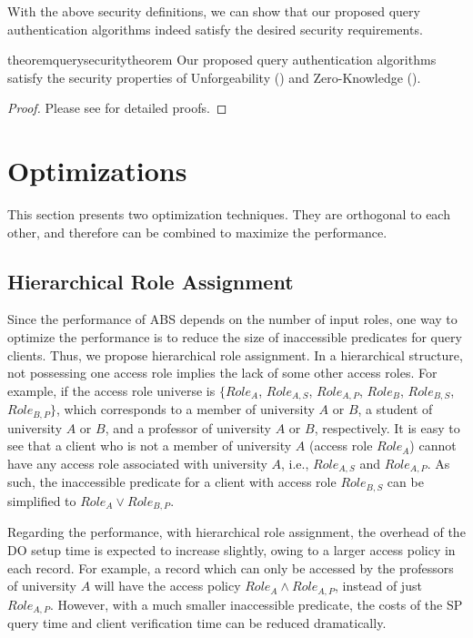 With the above security definitions, we can show that our proposed query authentication algorithms indeed satisfy the desired security requirements.

\begin{restatable}{theorem}{querysecuritytheorem}\label{thm:access-control:sec}
  Our proposed query authentication algorithms satisfy the security properties of Unforgeability () and Zero-Knowledge ().
\end{restatable}

\begin{proof}
  Please see  for detailed proofs.
\end{proof}

\section{Optimizations}\label{sec:access-control:opt}

This section presents two optimization techniques. They are orthogonal to each other, and therefore can be combined to maximize the performance.

\subsection{Hierarchical Role Assignment}
Since the performance of ABS depends on the number of input roles, one way to optimize the performance is to reduce the size of inaccessible predicates for query clients. Thus, we propose hierarchical role assignment. In a hierarchical structure, not possessing one access role implies the lack of some other access roles. For example, if the access role universe is $\{{Role}_A$, ${Role}_{A,S}$, ${Role}_{A,P}$, ${Role}_B$, ${Role}_{B,S}$, ${Role}_{B,P}\}$, which corresponds to a member of university $A$ or $B$, a student of university $A$ or $B$, and a professor of university $A$ or $B$, respectively. It is easy to see that a client who is not a member of university $A$ (access role ${Role}_A$) cannot have any access role associated with university $A$, i.e., ${Role}_{A,S}$ and ${Role}_{A,P}$. As such, the inaccessible predicate for a client with access role ${Role}_{B,S}$ can be simplified to ${Role}_A \lor {Role}_{B,P}$.

Regarding the performance, with hierarchical role assignment, the overhead of the DO setup time is expected to increase slightly, owing to a larger access policy in each record. For example, a  record which can only be accessed by the professors of university $A$ will have the access policy ${Role}_{A} \land {Role}_{A,P}$, instead of just ${Role}_{A,P}$.
However, with a much smaller inaccessible predicate, the costs of the SP query time and client verification time can be reduced dramatically.

